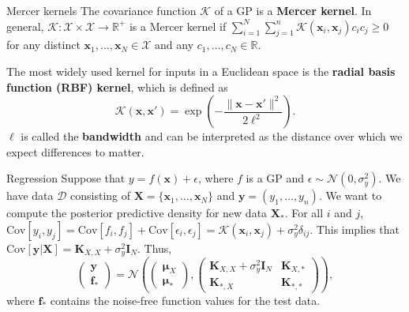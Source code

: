 \documentclass{beamer}
\begin{document}
\begin{frame}{Mercer kernels}
    The covariance function $\mathcal{K}$ of a GP is a \textbf{Mercer kernel}. In general, $\mathcal{K} : \mathcal{X} \times \mathcal{X} \to \mathbb{R}^+$ is a Mercer kernel if $\sum_{i = 1}^N \sum_{j = 1}^n \mathcal{K}(\boldsymbol{x}_i, \boldsymbol{x}_j)c_i c_j \ge 0$ for any distinct $\boldsymbol{x}_1, \ldots, \boldsymbol{x}_N \in \mathcal{X}$ and any $c_1, \ldots, c_N \in \mathbb{R}$.
    
    \medskip
    
    The most widely used kernel for inputs in a Euclidean space is the \textbf{radial basis function (RBF) kernel}, which is defined as
    \[
    \mathcal{K}(\boldsymbol{x}, \boldsymbol{x}') = \exp\left(-\frac{\|\boldsymbol{x} - \boldsymbol{x}'\|^2}{2\ell^2}\right).
    \]
    $\ell$ is called the \textbf{bandwidth} and can be interpreted as the distance over which we expect differences to matter.
\end{frame}

\begin{frame}{Regression}
    Suppose that $y = f(\boldsymbol{x}) + \epsilon$, where $f$ is a GP and $\epsilon \sim \mathcal{N}(0, \sigma_y^2)$. We have data $\mathcal{D}$ consisting of $\boldsymbol{X} = \{\boldsymbol{x}_1, \ldots, \boldsymbol{x}_N\}$ and $\boldsymbol{y} = (y_1, \ldots, y_n)$. We want to compute the posterior predictive density for new data $\boldsymbol{X}_*$. For all $i$ and $j$, $\text{Cov}[y_i, y_j] = \text{Cov}[f_i, f_j] + \text{Cov}[\epsilon_i, \epsilon_j] = \mathcal{K}(\boldsymbol{x}_i, \boldsymbol{x}_j) + \sigma_y^2 \delta_{i j}$. This implies that $\text{Cov}[\boldsymbol{y} | \boldsymbol{X}] = \boldsymbol{K}_{X, X} + \sigma_y^2 \boldsymbol{I}_N$. Thus,
    \[
    \left(\begin{matrix} \boldsymbol{y} \\ \boldsymbol{f}_* \end{matrix}\right) = \mathcal{N}\left(\left(\begin{matrix} \boldsymbol{\mu}_X \\ \boldsymbol{\mu}_* \end{matrix}\right), \left(\begin{matrix} \boldsymbol{K}_{X, X} + \sigma_y^2 \boldsymbol{I}_N & \boldsymbol{K}_{X, *} \\ \boldsymbol{K}_{*, X} & \boldsymbol{K}_{*, *} \end{matrix}\right)\right),
    \]
    where $\boldsymbol{f}_*$ contains the noise-free function values for the test data.
\end{frame}
\end{document}
